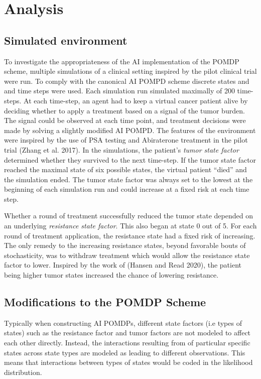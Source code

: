 \documentclass[
]{article}
\begin{document}
\section{Analysis}\label{analysis}

\subsection{Simulated environment}\label{simulated-environment}

To investigate the appropriateness of the AI implementation of the POMDP
scheme, multiple simulations of a clinical setting inspired by the pilot
clinical trial were run. To comply with the canonical AI POMPD scheme
discrete states and and time steps were used. Each simulation run
simulated maximally of 200 time-steps. At each time-step, an agent had
to keep a virtual cancer patient alive by deciding whether to apply a
treatment based on a signal of the tumor burden. The signal could be
observed at each time point, and treatment decisions were made by
solving a slightly modified AI POMPD. The features of the environment
were inspired by the use of PSA testing and Abiraterone treatment in the
pilot trial (Zhang et al. 2017). In the simulations, the patient's
\emph{tumor state factor} determined whether they survived to the next
time-step. If the tumor state factor reached the maximal state of six
possible states, the virtual patient ``died'' and the simulation ended.
The tumor state factor was always set to the lowest at the beginning of
each simulation run and could increase at a fixed risk at each time
step.

Whether a round of treatment successfully reduced the tumor state
depended on an underlying \emph{resistance state factor}. This also
began at state 0 out of 5. For each round of treatment application, the
resistance state had a fixed risk of increasing. The only remedy to the
increasing resistance states, beyond favorable bouts of stochasticity,
was to withdraw treatment which would allow the resistance state factor
to lower. Inspired by the work of (Hansen and Read 2020), the patient
being higher tumor states increased the chance of lowering resistance.

\subsection{Modifications to the POMDP
Scheme}\label{modifications-to-the-pomdp-scheme}

Typically when constructing AI POMDPs, different state factors (i.e
types of states) such as the resistance factor and tumor factors are not
modeled to affect each other directly. Instead, the interactions
resulting from of particular specific states across state types are
modeled as leading to different observations. This means that
interactions between types of states would be coded in the likelihood
distribution.
\end{document}
